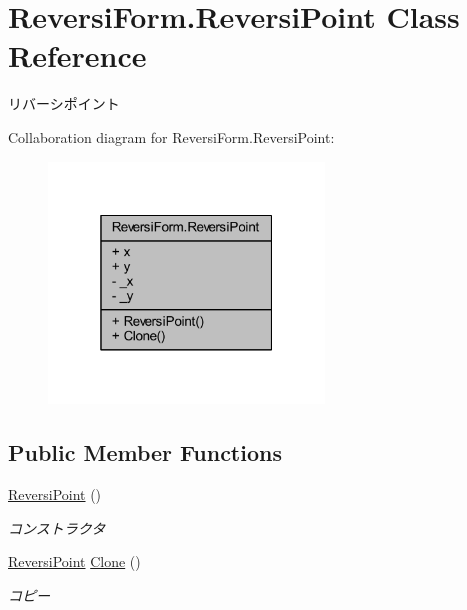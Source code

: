 \hypertarget{class_reversi_form_1_1_reversi_point}{}\section{Reversi\+Form.\+Reversi\+Point Class Reference}
\label{class_reversi_form_1_1_reversi_point}


リバーシポイント  




Collaboration diagram for Reversi\+Form.\+Reversi\+Point\+:
\nopagebreak
\begin{figure}[H]
\begin{center}
\leavevmode
\includegraphics[width=208pt]{class_reversi_form_1_1_reversi_point__coll__graph}
\end{center}
\end{figure}
\subsection*{Public Member Functions}
\begin{DoxyCompactItemize}
\item 
\hyperlink{class_reversi_form_1_1_reversi_point_a19bc338ec65d6b967f741c1c73ad5b16}{Reversi\+Point} ()
\begin{DoxyCompactList}\small\item\em コンストラクタ \end{DoxyCompactList}\item 
\hyperlink{class_reversi_form_1_1_reversi_point}{Reversi\+Point} \hyperlink{class_reversi_form_1_1_reversi_point_a0a237cffa3c12ec78bdf19c3baecfa69}{Clone} ()
\begin{DoxyCompactList}\small\item\em コピー \end{DoxyCompactList}\end{DoxyCompactItemize}
